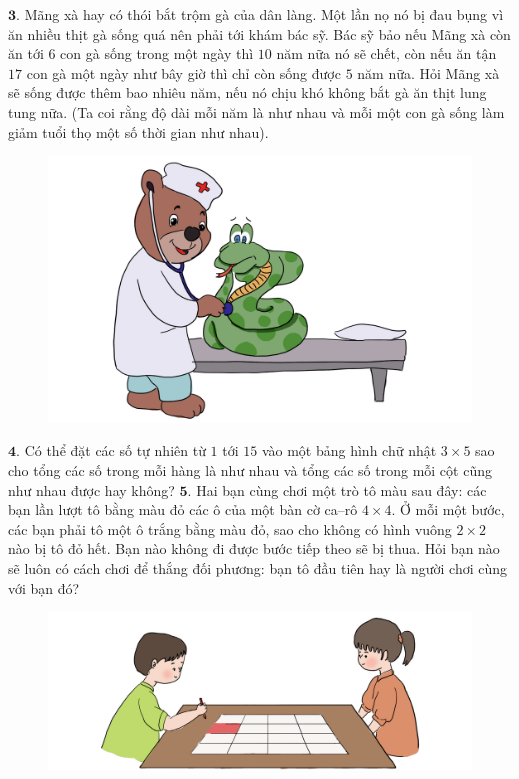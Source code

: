 \begin{multicols}{2}
\begin{figure}[H]
		\vspace*{-15pt}
	\end{figure}
	$\pmb{3.}$ Mãng xà hay có thói bắt trộm gà của dân làng. Một lần nọ nó bị đau bụng vì ăn nhiều thịt gà sống quá nên phải tới khám bác sỹ. Bác sỹ bảo nếu Mãng xà còn ăn tới $6$ con gà sống trong một ngày thì $10$ năm nữa nó sẽ chết, còn nếu ăn tận $17$ con gà một ngày như bây giờ thì chỉ còn sống được $5$ năm nữa. Hỏi Mãng xà sẽ sống được thêm bao nhiêu năm, nếu nó chịu khó không bắt gà ăn thịt lung tung nữa. (Ta coi rằng độ dài mỗi năm là như nhau và mỗi một con gà sống làm giảm tuổi thọ một số thời gian như nhau).
	\begin{figure}[H]
		\vspace*{-5pt}
		\centering
		\captionsetup{labelformat= empty, justification=centering}
		\includegraphics[width= 0.85\linewidth]{bai3}
		\vspace*{-10pt}
	\end{figure}
	$\pmb{4.}$ Có thể đặt các số tự nhiên từ $1$ tới $15$ vào một bảng hình chữ nhật $3\times 5$ sao cho tổng các số trong mỗi hàng là như nhau và tổng các số trong mỗi cột cũng như nhau được hay không?
	\vskip 0.1cm
	$\pmb{5.}$ Hai bạn cùng chơi một trò tô màu sau đây: các bạn lần lượt tô bằng màu đỏ các ô của một bàn cờ ca--rô $4\times 4$. Ở mỗi một bước, các bạn phải tô một ô trắng bằng màu đỏ, sao cho không có hình vuông $2\times 2$ nào bị tô đỏ hết. Bạn nào không đi được bước tiếp theo sẽ bị thua. Hỏi bạn nào sẽ luôn có cách chơi để thắng đối phương: bạn tô đầu tiên hay là người chơi cùng với bạn đó? 
	\begin{figure}[H]
		\vspace*{-5pt}
		\centering
		\captionsetup{labelformat= empty, justification=centering}
		\includegraphics[width= 1\linewidth]{bai5}

\end{figure}
\end{multicols}
